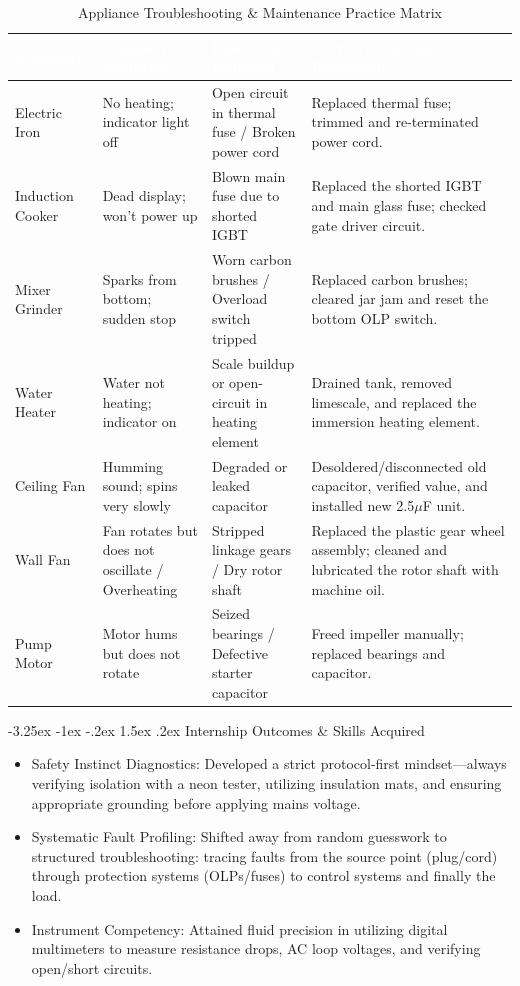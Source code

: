 \documentclass[11pt,a4paper]{report}
\makeatletter
\renewcommand{\section}{\@startsection{section}{1}{\z@}%
  {-3.25ex \@plus -1ex \@minus -.2ex}%
  {1.5ex \@plus.2ex}%
  {\normalfont\Large\bfseries\color{primaryColor}}}
\makeatother
\begin{document}
\begin{table}[H]
\centering
\begin{tabularx}{\textwidth}{l X X X}
\rowcolor{primaryColor}
\textcolor{white}{\textbf{Appliance}} & \textcolor{white}{\textbf{Common Symptom}} & \textcolor{white}{\textbf{Root Cause Detected}} & \textcolor{white}{\textbf{Corrective Action Performed}} \\
\midrule
Electric Iron & No heating; indicator light off & Open circuit in thermal fuse / Broken power cord & Replaced thermal fuse; trimmed and re-terminated power cord. \\
Induction Cooker & Dead display; won't power up & Blown main fuse due to shorted IGBT & Replaced the shorted IGBT and main glass fuse; checked gate driver circuit. \\
Mixer Grinder & Sparks from bottom; sudden stop & Worn carbon brushes / Overload switch tripped & Replaced carbon brushes; cleared jar jam and reset the bottom OLP switch. \\
Water Heater & Water not heating; indicator on & Scale buildup or open-circuit in heating element & Drained tank, removed limescale, and replaced the immersion heating element. \\
Ceiling Fan & Humming sound; spins very slowly & Degraded or leaked capacitor & Desoldered/disconnected old capacitor, verified value, and installed new 2.5$\mu$F unit. \\
Wall Fan & Fan rotates but does not oscillate / Overheating & Stripped linkage gears / Dry rotor shaft & Replaced the plastic gear wheel assembly; cleaned and lubricated the rotor shaft with machine oil. \\
Pump Motor & Motor hums but does not rotate & Seized bearings / Defective starter capacitor & Freed impeller manually; replaced bearings and capacitor. \\
\bottomrule
\end{tabularx}
\caption{Appliance Troubleshooting \& Maintenance Practice Matrix}
\end{table}
\section{Internship Outcomes \& Skills Acquired}
\begin{itemize}
  \item Safety Instinct Diagnostics: Developed a strict protocol-first mindset—always verifying isolation with a neon tester, utilizing insulation mats, and ensuring appropriate grounding before applying mains voltage.
  \item Systematic Fault Profiling: Shifted away from random guesswork to structured troubleshooting: tracing faults from the source point (plug/cord) through protection systems (OLPs/fuses) to control systems and finally the load.
  \item Instrument Competency: Attained fluid precision in utilizing digital multimeters to measure resistance drops, AC loop voltages, and verifying open/short circuits.
\end{itemize}
\end{document}
